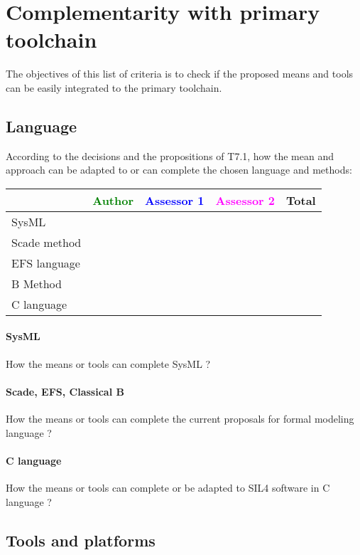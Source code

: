 \section{Complementarity with primary toolchain}

The objectives of this list of criteria is to check if the proposed means and tools can be easily integrated to the primary toolchain.

\subsection{Language}


According to the decisions and the propositions of T7.1, how the mean and approach can be adapted to or can complete the chosen language and methods:

\begin{tabular}{|l | c | c | c | c|}
\hline
& \textcolor{green}{Author} & \textcolor{blue}{Assessor 1} & \textcolor{magenta}{Assessor 2} & Total \\
\hline 
SysML  & & & & \\
\hline
Scade method & & & & \\
\hline
EFS language & & & & \\
\hline
B Method & & & & \\
\hline
C language & & & & \\
\hline
\end{tabular}

\paragraph{SysML}
How the means or tools can complete SysML ?


\paragraph{Scade, EFS, Classical B}
How the means or tools can complete the current proposals for formal modeling language ?

\paragraph{C language}
How the means or tools can complete or be adapted to SIL4 software in C language ?

\subsection{Tools and platforms}

